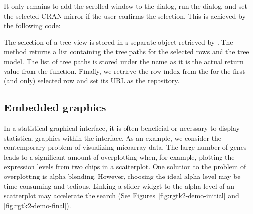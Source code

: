 \documentclass[article,shortnames]{jss}
\begin{document}
It only remains to add the scrolled window to the dialog, run the
dialog, and set the selected CRAN mirror if the user confirms the
selection. This is achieved by the following code:
%
The selection of a tree view is stored in a separate
 object retrieved by
. The  method
returns a list containing the tree paths for the selected rows and the
tree model. The list of tree paths is stored under the name
 as it is the actual return value from the 
function. Finally, we retrieve the row index from the
 for the first (and only) selected row and set its
URL as the repository.


\subsection[Embedded R graphics]{Embedded 
graphics}\label{sec:embedded-graphics}

In a statistical graphical interface, it is often beneficial or
necessary to display statistical graphics within the interface. As
an example, we consider the contemporary problem of visualizing
micoarray data. The large number of genes leads to a significant
amount of overplotting when, for example, plotting the expression
levels from two chips in a scatterplot. One solution to the problem of
overplotting is alpha blending. However, choosing the ideal alpha
level may be time-consuming and tedious. Linking a slider widget to
the alpha level of an  scatterplot may accelerate the
search (See Figures~\ref{fig:rgtk2-demo-initial} and
\ref{fig:rgtk2-demo-final}).


\end{document}
